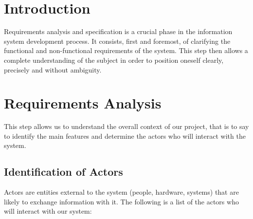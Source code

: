 \section*{Introduction}

Requirements analysis and specification is a crucial phase in the information system
development process. It consists, first and foremost, of clarifying the functional
and non-functional requirements of the system. This step then allows a complete
understanding of the subject in order to position oneself clearly, precisely and
without ambiguity.

\section{Requirements Analysis}

This step allows us to understand the overall context of our project, that is to say
to identify the main features and determine the actors who will interact with the
system.

\subsection{Identification of Actors}

Actors are entities external to the system (people, hardware, systems) that are
likely to exchange information with it. The following is a list of the actors who
will interact with our system:

